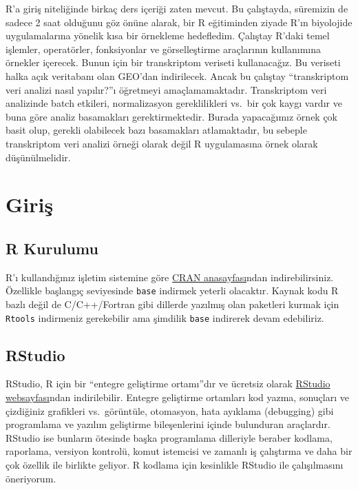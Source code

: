 \documentclass[
]{book}
\begin{document}
R'a giriş niteliğinde birkaç ders içeriği zaten mevcut. Bu çalıştayda, süremizin de sadece 2 saat olduğunu göz önüne alarak, bir R eğitiminden ziyade R'ın biyolojide uygulamalarına yönelik kısa bir örnekleme hedefledim. Çalıştay R'daki temel işlemler, operatörler, fonksiyonlar ve görselleştirme araçlarının kullanımına örnekler içerecek. Bunun için bir transkriptom veriseti kullanacağız. Bu veriseti halka açık veritabanı olan GEO'dan indirilecek. Ancak bu çalıştay ``transkriptom veri analizi nasıl yapılır?''ı öğretmeyi amaçlamamaktadır. Transkriptom veri analizinde batch etkileri, normalizasyon gereklilikleri vs.~bir çok kaygı vardır ve buna göre analiz basamakları gerektirmektedir. Burada yapacağımız örnek çok basit olup, gerekli olabilecek bazı basamakları atlamaktadır, bu sebeple transkriptom veri analizi örneği olarak değil R uygulamasına örnek olarak düşünülmelidir.

\hypertarget{giriux15f}{%
\chapter{Giriş}\label{giriux15f}}

\hypertarget{r-kurulumu}{%
\section{R Kurulumu}\label{r-kurulumu}}

R'ı kullandığınız işletim sistemine göre \href{https://cran.r-project.org/}{CRAN anasayfası}ndan indirebilirsiniz. Özellikle başlangıç seviyesinde \texttt{base} indirmek yeterli olacaktır. Kaynak kodu R bazlı değil de C/C++/Fortran gibi dillerde yazılmış olan paketleri kurmak için \texttt{Rtools} indirmeniz gerekebilir ama şimdilik \texttt{base} indirerek devam edebiliriz.

\hypertarget{rstudio}{%
\section{RStudio}\label{rstudio}}

RStudio, R için bir ``entegre geliştirme ortamı''dır ve ücretsiz olarak \href{https://www.rstudio.com/}{RStudio websayfası}ndan indirilebilir. Entegre geliştirme ortamları kod yazma, sonuçları ve çizdiğiniz grafikleri vs.~görüntüle, otomasyon, hata ayıklama (debugging) gibi programlama ve yazılım geliştirme bileşenlerini içinde bulunduran araçlardır. RStudio ise bunların ötesinde başka programlama dilleriyle beraber kodlama, raporlama, versiyon kontrolü, komut istemcisi ve zamanlı iş çalıştırma ve daha bir çok özellik ile birlikte geliyor. R kodlama için kesinlikle RStudio ile çalışılmasını öneriyorum.
\end{document}

